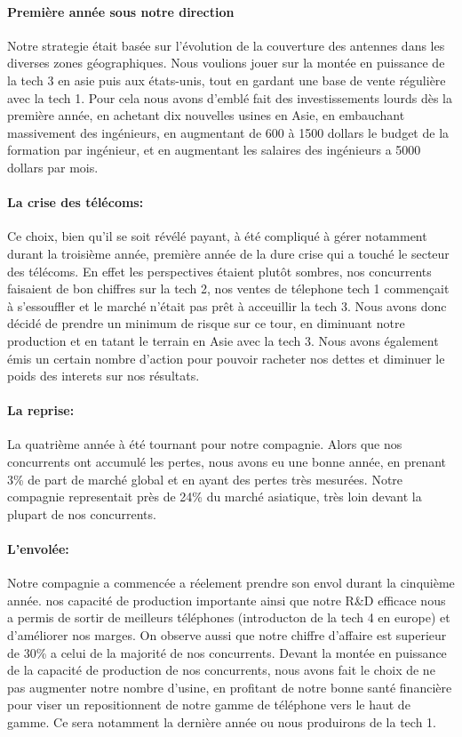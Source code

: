 \paragraph{Première année sous notre direction}
Notre strategie était basée sur l'évolution de la couverture des
antennes dans les diverses zones géographiques. Nous voulions jouer
sur la montée en puissance de la tech 3 en asie puis aux états-unis,
tout en gardant une base de vente régulière avec la tech 1. Pour cela
nous avons d'emblé fait des investissements lourds dès la première
année, en achetant dix nouvelles usines en Asie, en embauchant
massivement des ingénieurs, en augmentant de 600 à 1500 dollars le
budget de la formation par ingénieur, et en augmentant les salaires
des ingénieurs a 5000 dollars par mois.

\paragraph{La crise des télécoms:}

Ce choix, bien qu'il se soit révélé payant, à été compliqué à gérer
notamment durant la troisième année, première année de la dure crise
qui a touché le secteur des télécoms. En effet les perspectives
étaient plutôt sombres, nos concurrents faisaient de bon chiffres sur
la tech 2, nos ventes de télephone tech 1 commençait à s'essouffler et
le marché n'était pas prêt à acceuillir la tech 3. Nous avons donc
décidé de prendre un minimum de risque sur ce tour, en diminuant notre
production et en tatant le terrain en Asie avec la tech 3. Nous avons
également émis un certain nombre d'action pour pouvoir racheter nos
dettes et diminuer le poids des interets sur nos résultats.

\paragraph{La reprise:}

La quatrième année à été tournant pour notre compagnie. Alors que nos
concurrents ont accumulé les pertes, nous avons eu une bonne année, en
prenant 3\% de part de marché global et en ayant des pertes très
mesurées. Notre compagnie representait près de 24\% du marché
asiatique, très loin devant la plupart de nos concurrents.

\paragraph{L'envolée:}

Notre compagnie a commencée a réelement prendre son envol durant la
cinquième année. nos capacité de production importante ainsi que notre
R\&D efficace nous a permis de sortir de meilleurs téléphones
(introducton de la tech 4 en europe) et d'améliorer nos marges. On
observe aussi que notre chiffre d'affaire est superieur de 30\% a
celui de la majorité de nos concurrents. Devant la montée en puissance
de la capacité de production de nos concurrents, nous avons fait le
choix de ne pas augmenter notre nombre d'usine, en profitant de notre
bonne santé financière pour viser un repositionnent de notre gamme de
téléphone vers le haut de gamme. Ce sera notamment la dernière année
ou nous produirons de la tech 1.

